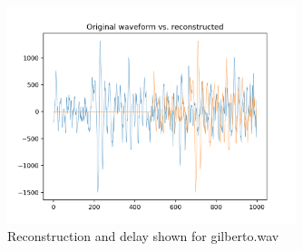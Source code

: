 \documentclass[11pt,a4paper]{article}
\begin{document}
\begin{figure}[ht]
	\centering
	\includegraphics[width=0.75\textwidth]{synthesis/gilberto_delay}
	\caption{Reconstruction and delay shown for gilberto.wav}
	\label{fig:synthesis_gilberto}
\end{figure}

\pagebreak
\end{document}
